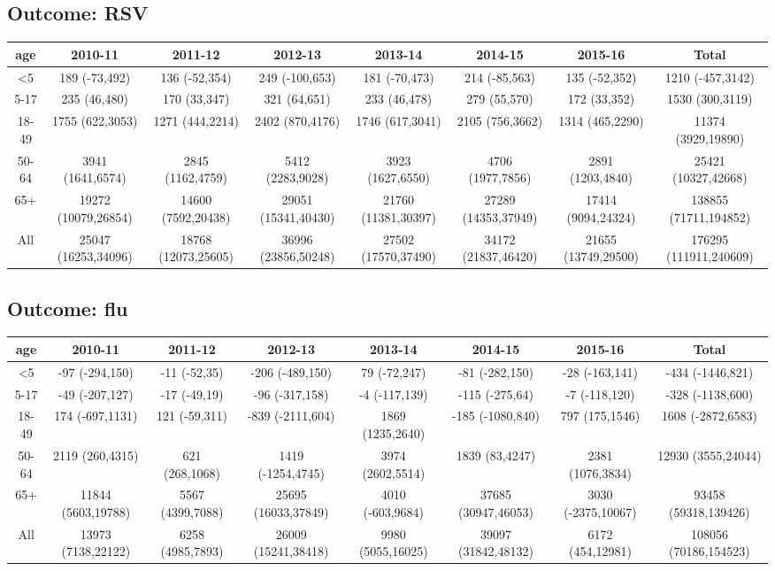 \documentclass[landscape]{article}\usepackage[]{graphicx}\usepackage[]{color}
\begin{document}
\subsection{Outcome: RSV}
\begin{table}[ht]
\begin{tabular}{cccccccc}
age & 2010-11 & 2011-12 & 2012-13 & 2013-14 & 2014-15 & 2015-16 & Total\\
\hline
<5 & 189 (-73,492) & 136 (-52,354) & 249 (-100,653) & 181 (-70,473) & 214 (-85,563) & 135 (-52,352) & 1210 (-457,3142) \\
5-17 & 235 (46,480) & 170 (33,347) & 321 (64,651) & 233 (46,478) & 279 (55,570) & 172 (33,352) & 1530 (300,3119) \\
18-49 & 1755 (622,3053) & 1271 (444,2214) & 2402 (870,4176) & 1746 (617,3041) & 2105 (756,3662) & 1314 (465,2290) & 11374 (3929,19890) \\
50-64 & 3941 (1641,6574) & 2845 (1162,4759) & 5412 (2283,9028) & 3923 (1627,6550) & 4706 (1977,7856) & 2891 (1203,4840) & 25421 (10327,42668) \\
65+ & 19272 (10079,26854) & 14600 (7592,20438) & 29051 (15341,40430) & 21760 (11381,30397) & 27289 (14353,37949) & 17414 (9094,24324) & 138855 (71711,194852) \\
All & 25047 (16253,34096) & 18768 (12073,25605) & 36996 (23856,50248) & 27502 (17570,37490) & 34172 (21837,46420) & 21655 (13749,29500) & 176295 (111911,240609) \\

\hline
\end{tabular}
\end{table}


\subsection{Outcome: flu}
\begin{table}[ht]
\begin{tabular}{cccccccc}
age & 2010-11 & 2011-12 & 2012-13 & 2013-14 & 2014-15 & 2015-16 & Total\\
\hline
<5 & -97 (-294,150) & -11 (-52,35) & -206 (-489,150) & 79 (-72,247) & -81 (-282,150) & -28 (-163,141) & -434 (-1446,821) \\
5-17 & -49 (-207,127) & -17 (-49,19) & -96 (-317,158) & -4 (-117,139) & -115 (-275,64) & -7 (-118,120) & -328 (-1138,600) \\
18-49 & 174 (-697,1131) & 121 (-59,311) & -839 (-2111,604) & 1869 (1235,2640) & -185 (-1080,840) & 797 (175,1546) & 1608 (-2872,6583) \\
50-64 & 2119 (260,4315) & 621 (268,1068) & 1419 (-1254,4745) & 3974 (2602,5514) & 1839 (83,4247) & 2381 (1076,3834) & 12930 (3555,24044) \\
65+ & 11844 (5603,19788) & 5567 (4399,7088) & 25695 (16033,37849) & 4010 (-603,9684) & 37685 (30947,46053) & 3030 (-2375,10067) & 93458 (59318,139426) \\
All & 13973 (7138,22122) & 6258 (4985,7893) & 26009 (15241,38418) & 9980 (5055,16025) & 39097 (31842,48132) & 6172 (454,12981) & 108056 (70186,154523) \\

\hline
\end{tabular}
\end{table}
\end{document}
